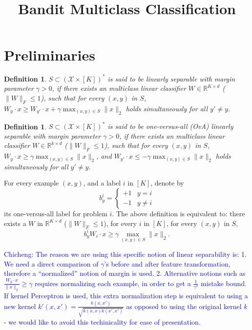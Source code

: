\documentclass{article}
\title{Bandit Multiclass Classification}
\newcommand{\calX}{{\mathcal{X}}}
\newcommand{\field}[1]{\mathbb{#1}}
\newcommand{\fR}{\field{R}}
\newcommand{\cz}[1]{\textcolor{blue}{Chicheng: #1}}
\newtheorem{definition}[theorem]{Definition}
\begin{document}

\maketitle

\section{Preliminaries}
\begin{definition}
$S \subset (\calX \times [K])^*$ is said to be {\em linearly separable} with margin parameter $\gamma > 0$, if there exists an multiclass linear classifier $W \in \fR^{K \times d}$ ($\| W \|_F \leq 1$),
such that for every $(x,y)$ in $S$,
$W_y \cdot x \geq W_{y'} \cdot x + \gamma \max_{(x,y) \in S} \| x \|_2$ holds simultaneously for all $y' \neq y$.
\label{def:mc-margin}
\end{definition}

\begin{definition}
$S \subset (\calX \times [K])^*$ is said to be {\em one-versus-all (OvA) linearly separable} with margin parameter $\gamma > 0$, if there exists an multiclass linear classifier $W \in \fR^{k \times d}$ ($\| W \|_F \leq 1$),
such that for every $(x,y)$ in $S$,
$W_y \cdot x \geq \gamma \max_{(x,y) \in S} \| x \|_2 $, 
and 
$W_{y'} \cdot x \leq -\gamma \max_{(x,y) \in S} \| x \|_2$
holds simultaneously for all $y' \neq y$.
\label{def:mc-ova-margin}
\end{definition}

For every example $(x, y)$, and a label $i$ in $[K]$, denote by 
\[ b_y^i = \begin{cases} +1  & y = i \\ -1 & y \neq i \end{cases} \]
its one-versus-all label for problem $i$. The above definition is equivalent to: there exists a $W$ in $\fR^{K \times d}$ ($\|W\|_F \leq 1$),
for every $i$ in $[K]$,
for every $(x, y)$ in $S$,
\[ 
b_y^i W_i \cdot x \geq \gamma \max_{(x,y) \in S} \| x \|_2.
\]


\cz{The reason we are using this specific notion of linear separability is:
1. We need a direct comparison of $\gamma$'s before and after feature transformation, therefore a ``normalized'' notion of margin is used.  
2. Alternative notions such as $\frac{W_y \cdot x}{\| x \|_2} \geq \gamma$ requires normalizing each example, in order to get a $\frac{1}{\gamma^2}$ mistake bound. If kernel Perceptron is used, this extra normalization step is equivalent to using a new kernel $k'(x,x') = \frac{k(x,x')}{\sqrt{k(x,x) k(x',x')}}$ as opposed to using the original kernel $k$ - we would like to avoid this techinicality for ease of presentation.}
\end{document}
